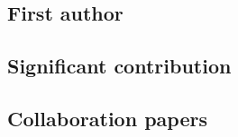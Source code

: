 \documentclass[letterpaper,12pt,preprint]{article}
\begin{document}



 \subsection*{First author}
\begin{list}{}{\cvlist}

\end{list}

\subsection*{Significant contribution}

\begin{list}{}{\cvlist}

\end{list}

\subsection*{Collaboration papers}

\begin{list}{}{\cvlist}

\end{list}
\end{document}
